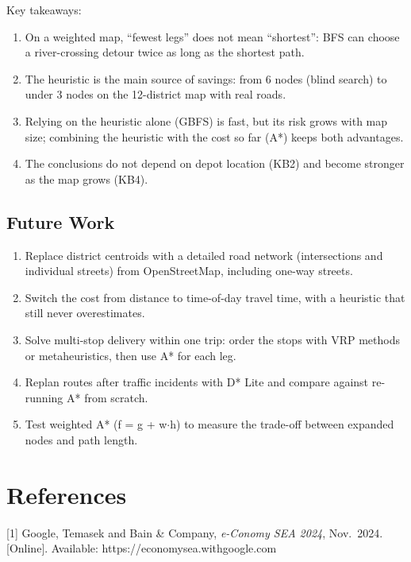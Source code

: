 \documentclass[12pt,a4paper]{article}
\providecommand{\tightlist}{\setlength{\itemsep}{0pt}\setlength{\parskip}{0pt}}
\begin{document}
Key takeaways:

\begin{enumerate}
\def\labelenumi{\arabic{enumi}.}
\tightlist
\item
  On a weighted map, ``fewest legs'' does not mean
  ``shortest'': BFS can choose a river-crossing detour twice
  as long as the shortest path.
\item
  The heuristic is the main source of savings: from 6 nodes
  (blind search) to under 3 nodes on the 12-district map
  with real roads.
\item
  Relying on the heuristic alone (GBFS) is fast, but its
  risk grows with map size; combining the heuristic with the
  cost so far (A*) keeps both advantages.
\item
  The conclusions do not depend on depot location (KB2) and
  become stronger as the map grows (KB4).
\end{enumerate}

\subsection{Future Work}

\begin{enumerate}
\def\labelenumi{\arabic{enumi}.}
\tightlist
\item
  Replace district centroids with a detailed road network
  (intersections and individual streets) from OpenStreetMap,
  including one-way streets.
\item
  Switch the cost from distance to time-of-day travel time,
  with a heuristic that still never overestimates.
\item
  Solve multi-stop delivery within one trip: order the stops
  with VRP methods or metaheuristics, then use A* for each
  leg.
\item
  Replan routes after traffic incidents with D* Lite and
  compare against re-running A* from scratch.
\item
  Test weighted A* (f = g + w\(\cdot\)h) to measure the
  trade-off between expanded nodes and path length.
\end{enumerate}

\section*{References}

{[}1{]} Google, Temasek and Bain \& Company, \emph{e-Conomy
SEA 2024}, Nov.~2024. {[}Online{]}. Available:
https://economysea.withgoogle.com
\end{document}
